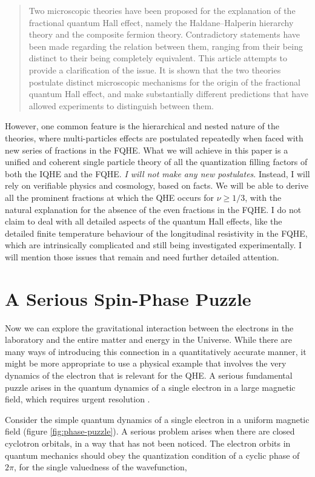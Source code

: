 \documentclass[aps,preprint,12pt,tightenlines]{revtex4}%
\begin{document}
\begin{quote}
Two microscopic theories have been proposed for the explanation of the
fractional quantum Hall effect, namely the Haldane--Halperin hierarchy theory
and the composite fermion theory. Contradictory statements have been made
regarding the relation between them, ranging from their being distinct to
their being completely equivalent. This article attempts to provide a
clarification of the issue. It is shown that the two theories postulate
distinct microscopic mechanisms for the origin of the fractional quantum Hall
effect, and make substantially different predictions that have allowed
experiments to distinguish between them.
\end{quote}

However, one common feature is the hierarchical and nested nature of the
theories, where multi-particles effects are postulated repeatedly when faced
with new series of fractions in the FQHE. What we will achieve in this paper
is a unified and coherent single particle theory of all the quantization
filling factors of both the IQHE and the FQHE. \emph{I will not make any new
postulates}. Instead, I will rely on verifiable physics and cosmology, based on facts. We
will be able to derive all the prominent fractions at which the QHE occurs for
$\nu\geq1/3$, with the natural explanation for the absence of the even
fractions in the FQHE. I do not claim to deal with all detailed aspects of the
quantum Hall effects, like the detailed finite temperature behaviour of the
longitudinal resistivity in the FQHE, which are intrinsically complicated and
still being investigated experimentally. I will mention those issues that
remain and need further detailed attention.

\section{A Serious Spin-Phase Puzzle}

Now we can explore the gravitational interaction between the electrons in the
laboratory and the entire matter and energy in the Universe. While there are
many ways of introducing this connection in a quantitatively accurate manner,
it might be more appropriate to use a physical example that involves the very
dynamics of the electron that is relevant for the QHE. A serious fundamental
puzzle arises in the quantum dynamics of a single electron in a large magnetic
field, which requires urgent resolution \cite{Unni-PhysNews}. 

Consider the simple quantum dynamics of a single electron in a uniform
magnetic field (figure \ref{fig:phase-puzzle}). A serious problem arises when there are closed cyclotron
orbitals, in a way that has not been noticed. The electron orbits in quantum
mechanics should obey the quantization condition of a cyclic phase of $2\pi$,
for the single valuedness of the wavefunction,
\end{document}
